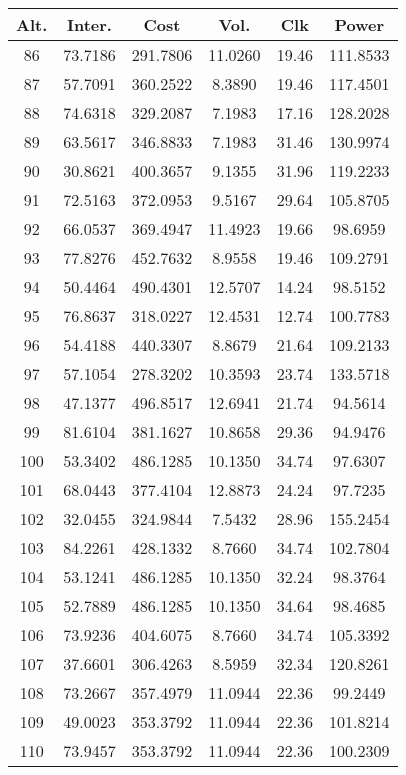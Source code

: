 \begin{center}
\begin{footnotesize}
\begin{tabular}{|c|ccccc|}
\hline
Alt. & Inter. & Cost & Vol. & Clk & Power\\
\hline
86 & 73.7186 & 291.7806 & 11.0260 & 19.46 & 111.8533 \\
87 & 57.7091 & 360.2522 & 8.3890 & 19.46 & 117.4501 \\
88 & 74.6318 & 329.2087 & 7.1983 & 17.16 & 128.2028 \\
89 & 63.5617 & 346.8833 & 7.1983 & 31.46 & 130.9974 \\
90 & 30.8621 & 400.3657 & 9.1355 & 31.96 & 119.2233 \\
91 & 72.5163 & 372.0953 & 9.5167 & 29.64 & 105.8705 \\
92 & 66.0537 & 369.4947 & 11.4923 & 19.66 & 98.6959 \\
93 & 77.8276 & 452.7632 & 8.9558 & 19.46 & 109.2791 \\
94 & 50.4464 & 490.4301 & 12.5707 & 14.24 & 98.5152 \\
95 & 76.8637 & 318.0227 & 12.4531 & 12.74 & 100.7783 \\
96 & 54.4188 & 440.3307 & 8.8679 & 21.64 & 109.2133 \\
97 & 57.1054 & 278.3202 & 10.3593 & 23.74 & 133.5718 \\
98 & 47.1377 & 496.8517 & 12.6941 & 21.74 & 94.5614 \\
99 & 81.6104 & 381.1627 & 10.8658 & 29.36 & 94.9476 \\
100 & 53.3402 & 486.1285 & 10.1350 & 34.74 & 97.6307 \\
101 & 68.0443 & 377.4104 & 12.8873 & 24.24 & 97.7235 \\
102 & 32.0455 & 324.9844 & 7.5432 & 28.96 & 155.2454 \\
103 & 84.2261 & 428.1332 & 8.7660 & 34.74 & 102.7804 \\
104 & 53.1241 & 486.1285 & 10.1350 & 32.24 & 98.3764 \\
105 & 52.7889 & 486.1285 & 10.1350 & 34.64 & 98.4685 \\
106 & 73.9236 & 404.6075 & 8.7660 & 34.74 & 105.3392 \\
107 & 37.6601 & 306.4263 & 8.5959 & 32.34 & 120.8261 \\
108 & 73.2667 & 357.4979 & 11.0944 & 22.36 & 99.2449 \\
109 & 49.0023 & 353.3792 & 11.0944 & 22.36 & 101.8214 \\
110 & 73.9457 & 353.3792 & 11.0944 & 22.36 & 100.2309 \\

\end{tabular}
\end{footnotesize}
\end{center}
